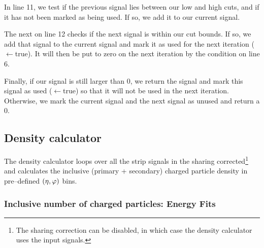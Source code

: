 \documentclass[11pt]{article}
\def\AlwaysText#1{\ifmmode\relax\text{#1}\else #1\fi}
\newcommand{\AbbrName}[1]{\AlwaysText{{\scshape #1}}}
\newcommand{\ESD}{\AbbrName{esd}}
\newcommand{\etaphi}{\ensuremath(\eta,\varphi)}
\begin{document}
In line 11, %
we test if the previous signal lies between our low and
high cuts, and if it has not been marked as being used.  If so, we add
it to our current signal.  

The next  on line 12 %
checks if the next signal is within our
cut bounds.  If so, we add that signal to the current signal and mark
it as used for the next iteration ($\leftarrow$true).  It will then be put to zero on the next
iteration by the condition on line 6.

Finally, if our signal is still larger than 0, we return the signal
and mark this signal as used ($\leftarrow$true) so that it will not be used in the next
iteration. Otherwise, we mark the current signal and the next signal
as unused and return a 0. 


\subsection{Density calculator}
\label{sec:sub:density_calculator}

The density calculator loops over all the strip signals in the sharing
corrected\footnote{The sharing correction can be disabled, in which
  case the density calculator uses the input \ESD{} signals.} \ESD{}
and calculates the inclusive (primary + secondary) charged particle
density in pre--defined $\etaphi$ bins.

\subsubsection{Inclusive number of charged particles: Energy Fits} 
\label{sec:sub:sub:eloss_fits}
\end{document}
